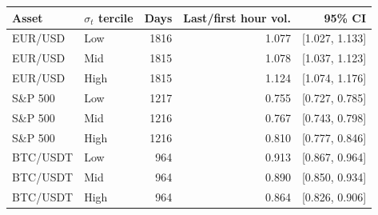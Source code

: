 \begin{tabular}{llrrr}
\toprule
Asset & $\sigma_t$ tercile & Days & Last/first hour vol. & 95\% CI \\
\midrule
EUR/USD & Low & 1816 & 1.077 & [1.027, 1.133] \\
EUR/USD & Mid & 1815 & 1.078 & [1.037, 1.123] \\
EUR/USD & High & 1815 & 1.124 & [1.074, 1.176] \\
S\&P 500 & Low & 1217 & 0.755 & [0.727, 0.785] \\
S\&P 500 & Mid & 1216 & 0.767 & [0.743, 0.798] \\
S\&P 500 & High & 1216 & 0.810 & [0.777, 0.846] \\
BTC/USDT & Low & 964 & 0.913 & [0.867, 0.964] \\
BTC/USDT & Mid & 964 & 0.890 & [0.850, 0.934] \\
BTC/USDT & High & 964 & 0.864 & [0.826, 0.906] \\
\bottomrule
\end{tabular}